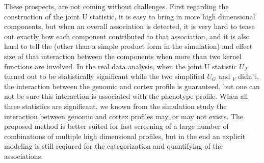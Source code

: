 These prospects, are not coming without challenges. First regarding the construction of the joint U statistic, it is easy to bring in more high dimensional components, but when an overall association is detected, it is very hard to tease out exactly how each component contributed to that association, and it is also hard to tell the  (other than a simple product form in the simulation) and effect size of that interaction between the components when more than two kernel functions are involved. In the real data analysis, when the joint U statistic $U_J$ turned out to be statistically significant while the two simplified $U_G$ and $_V$ didn't, the interaction between the genomic and cortex profile is guaranteed, but one can not be sure this interaction is associated with the phenotype profile. When all three statistics are significant, we known from the simulation study the interaction between genomic and cortex profiles may, or may not exists. The proposed method is better suited for fast screening of a large number of combinations of multiple high dimensional profiles, but in the end an explicit modeling is still reqiured for the categorization and quantifying of the associations.

